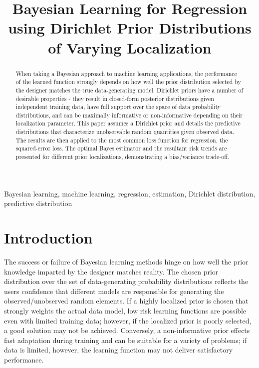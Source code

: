 \documentclass{article}
\title{Bayesian Learning for Regression using Dirichlet Prior Distributions of Varying Localization}
\begin{document}
\maketitle


\begin{abstract}
When taking a Bayesian approach to machine learning applications, the performance of the learned function strongly depends on how well the prior distribution selected by the designer matches the true data-generating model. Dirichlet priors have a number of desirable properties - they result in closed-form posterior distributions given independent training data, have full support over the space of data probability distributions, and can be maximally informative or non-informative depending on their localization parameter. This paper assumes a Dirichlet prior and details the predictive distributions that characterize unobservable random quantities given observed data. The results are then applied to the most common loss function for regression, the squared-error loss. The optimal Bayes estimator and the resultant risk trends are presented for different prior localizations, demonstrating a bias/variance trade-off.
\end{abstract}

\begin{keywords}
Bayesian learning, machine learning, regression, estimation, Dirichlet distribution, predictive distribution
\end{keywords}



\section{Introduction}

The success or failure of Bayesian learning methods hinge on how well the prior knowledge imparted by the designer matches reality. The chosen prior distribution over the set of data-generating probability distributions reflects the users confidence that different models are responsible for generating the observed/unobserved random elements. If a highly localized prior is chosen that strongly weights the actual data model, low risk learning functions are possible even with limited training data; however, if the localized prior is poorly selected, a good solution may not be achieved. Conversely, a non-informative prior effects fast adaptation during training and can be suitable for a variety of problems; if data is limited, however, the learning function may not deliver satisfactory performance.
\end{document}
